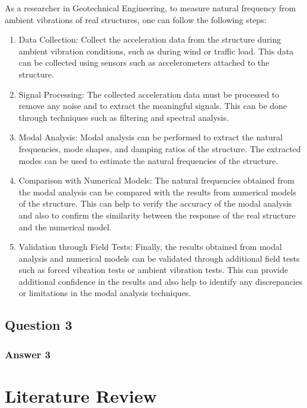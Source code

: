 \documentclass[
  letterpaper,
  DIV=11,
  numbers=noendperiod]{scrreprt}
\begin{document}
As a researcher in Geotechnical Engineering, to measure natural
frequency from ambient vibrations of real structures, one can follow the
following steps:

\begin{enumerate}
\def\labelenumi{\arabic{enumi}.}
\item
  Data Collection: Collect the acceleration data from the structure
  during ambient vibration conditions, such as during wind or traffic
  load. This data can be collected using sensors such as accelerometers
  attached to the structure.
\item
  Signal Processing: The collected acceleration data must be processed
  to remove any noise and to extract the meaningful signals. This can be
  done through techniques such as filtering and spectral analysis.
\item
  Modal Analysis: Modal analysis can be performed to extract the natural
  frequencies, mode shapes, and damping ratios of the structure. The
  extracted modes can be used to estimate the natural frequencies of the
  structure.
\item
  Comparison with Numerical Models: The natural frequencies obtained
  from the modal analysis can be compared with the results from
  numerical models of the structure. This can help to verify the
  accuracy of the modal analysis and also to confirm the similarity
  between the response of the real structure and the numerical model.
\item
  Validation through Field Tests: Finally, the results obtained from
  modal analysis and numerical models can be validated through
  additional field tests such as forced vibration tests or ambient
  vibration tests. This can provide additional confidence in the results
  and also help to identify any discrepancies or limitations in the
  modal analysis techniques.
\end{enumerate}

\hypertarget{question-3}{%
\section{Question 3}\label{question-3}}

\hypertarget{answer-3}{%
\subsection{Answer 3}\label{answer-3}}

\hypertarget{literature-review}{%
\chapter{Literature Review}\label{literature-review}}
\end{document}

